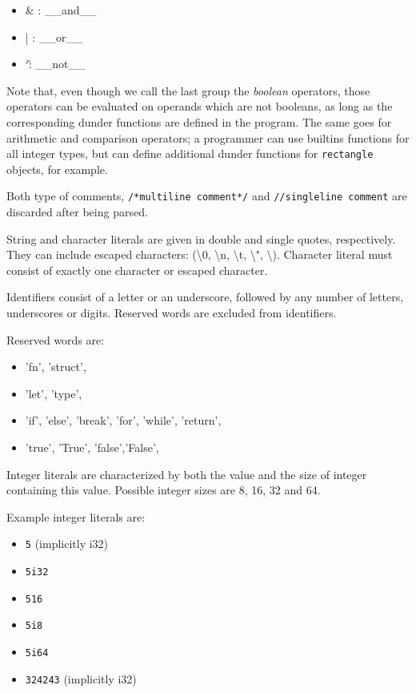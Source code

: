 \documentclass[times, utf8, diplomski]{fer}
\theoremstyle{definition}
\begin{document}
\begin{itemize}
    \item \& : \_\_and\_\_
    \item | : \_\_or\_\_
    \item \char`\~ : \_\_not\_\_
\end{itemize}

Note that, even though we call the last group the \textit{boolean} operators,
those operators can be evaluated on operands which are not booleans,
as long as the corresponding dunder functions are defined in the program.
The same goes for arithmetic and comparison operators; a programmer can use
builtins functions for all integer types, but can define additional dunder functions
for \texttt{rectangle} objects, for example.

Both type of comments, \texttt{/*multiline comment*/} and \texttt{//singleline comment} are discarded
after being parsed.

String and character literals are given in double and single quotes, respectively.
They can include escaped characters:  (\textbackslash 0, \textbackslash n, \textbackslash t, 
\textbackslash ", \textbackslash \textquotesingle). 
Character literal must consist of exactly one character or escaped character.

Identifiers consist of a letter or an underscore, followed by any number of letters, underscores or digits.
Reserved words are excluded from identifiers.

Reserved words are:
\begin{itemize}
    \item 'fn', 'struct',
    \item 'let', 'type',
    \item 'if', 'else', 'break', 'for', 'while', 'return',
    \item 'true', 'True', 'false','False',
\end{itemize}

Integer literals are characterized by both the value and the size of integer containing this value.
Possible integer sizes are 8, 16, 32 and 64.

Example integer literals are:
\begin{itemize}
    \item \texttt{5} (implicitly i32)
    \item \texttt{5i32}
    \item \texttt{516}
    \item \texttt{5i8}
    \item \texttt{5i64}
    \item \texttt{324243} (implicitly i32)
\end{itemize}
\end{document}

